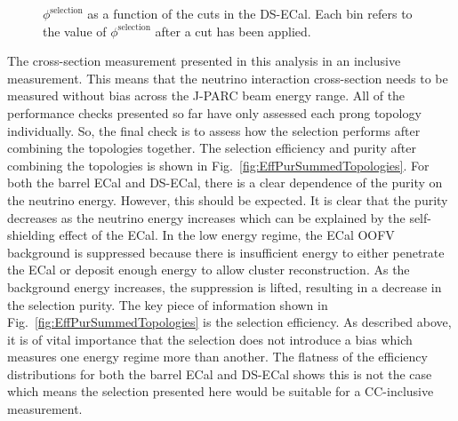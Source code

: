 \begin{figure}
\begin{minipage}{.5\linewidth}
\centering
{}
\end{minipage}\par\medskip
\caption{$\phi^{\textrm{selection}}$ as a function of the cuts in the DS-ECal.  Each bin refers to the value of $\phi^{\textrm{selection}}$ after a cut has been applied.}
\label{fig:SelFOMCutLevelDS}
\end{figure}
\newline
\newline
The cross-section measurement presented in this analysis in an inclusive measurement.  This means that the neutrino interaction cross-section needs to be measured without bias across the J-PARC beam energy range.  All of the performance checks presented so far have only assessed each prong topology individually.  So, the final check is to assess how the selection performs after combining the topologies together.  The selection efficiency and purity after combining the topologies is shown in Fig.~\ref{fig:EffPurSummedTopologies}.  For both the barrel ECal and DS-ECal, there is a clear dependence of the purity on the neutrino energy.  However, this should be expected.  It is clear that the purity decreases as the neutrino energy increases which can be explained by the self-shielding effect of the ECal.  In the low energy regime, the ECal OOFV background is suppressed because there is insufficient energy to either penetrate the ECal or deposit enough energy to allow cluster reconstruction.  As the background energy increases, the suppression is lifted, resulting in a decrease in the selection purity.  The key piece of information shown in Fig.~\ref{fig:EffPurSummedTopologies} is the selection efficiency.  As described above, it is of vital importance that the selection does not introduce a bias which measures one energy regime more than another.  The flatness of the efficiency distributions for both the barrel ECal and DS-ECal shows this is not the case which means the selection presented here would be suitable for a CC-inclusive measurement.
